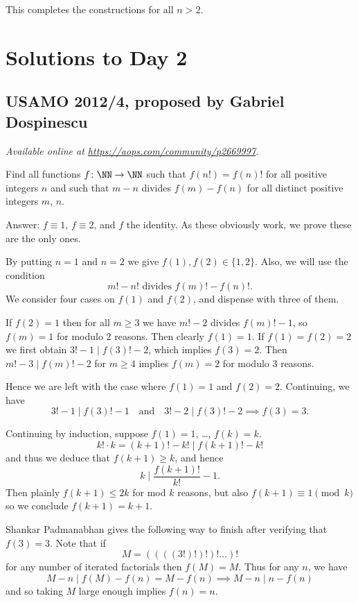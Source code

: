 \documentclass[11pt]{scrartcl}
\begin{document}
This completes the constructions for all $n > 2$.
\pagebreak

\section{Solutions to Day 2}
\subsection{USAMO 2012/4, proposed by Gabriel Dospinescu}
\textsl{Available online at \url{https://aops.com/community/p2669997}.}
\begin{mdframed}[style=mdpurplebox,frametitle={Problem statement}]
Find all functions $f \colon \NN \to \NN$ such that
$f(n!) = f(n)!$ for all positive integers $n$ and such that
$m-n$ divides $f(m) - f(n)$ for all distinct positive integers $m$, $n$.
\end{mdframed}
Answer: $f \equiv 1$, $f \equiv 2$, and $f$ the identity.
As these obviously work, we prove these are the only ones.

By putting $n=1$ and $n=2$ we give $f(1), f(2) \in \{1,2\}$.
Also, we will use the condition
\[ m!-n! \text{ divides } f(m)! - f(n)!. \]
We consider four cases on $f(1)$ and $f(2)$,
and dispense with three of them.
\begin{itemize}
  \ii If $f(2) = 1$ then for all $m \ge 3$ we have
  $m!-2$ divides $f(m)! - 1$, so $f(m) = 1$
  for modulo $2$ reasons.
  Then clearly $f(1) = 1$.
  \ii If $f(1) = f(2) = 2$ we first obtain
  $3!-1 \mid f(3)!-2$, which implies $f(3) = 2$.
  Then $m! - 3 \mid f(m)! - 2$ for $m \ge 4$
  implies $f(m)=2$ for modulo $3$ reasons.
\end{itemize}
Hence we are left with the case where $f(1) = 1$ and $f(2) = 2$.
Continuing, we have
\[ 3!-1 \mid f(3)! - 1 \quad\text{and}\quad
  3!-2 \mid f(3)!-2 \implies f(3) = 3. \]

Continuing by induction, suppose $f(1) = 1$, \dots, $f(k) = k$.
\[ k! \cdot k = (k+1)! - k! \mid f(k+1)! - k! \]
and thus we deduce that $f(k+1) \ge k$, and hence
\[ k \mid \frac{f(k+1)!}{k!} - 1. \]
Then plainly $f(k+1) \le 2k$ for mod $k$ reasons,
but also $f(k+1) \equiv 1 \pmod k$ so we conclude $f(k+1) = k+1$.

\begin{remark*}
  Shankar Padmanabhan gives the following way
  to finish after verifying that $f(3) = 3$.
  Note that if
  \[ M = ( ( ( (3!)! )! )! \dots )! \]
  for any number of iterated factorials
  then $f(M) = M$.
  Thus for any $n$, we have
  \[ M-n \mid f(M) - f(n) = M - f(n) \implies M - n \mid n - f(n) \]
  and so taking $M$ large enough implies $f(n) = n$.
\end{remark*}
\pagebreak
\end{document}
